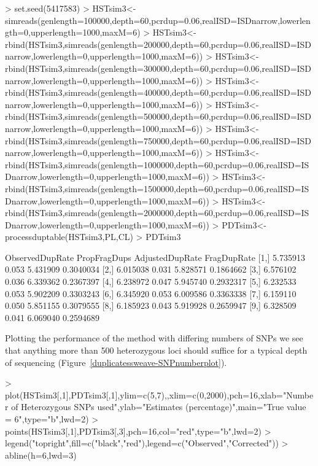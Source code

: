 \documentclass{article}
\begin{document}
\begin{Schunk}
\begin{Sinput}
> set.seed(5417583)
> HSTsim3<-simreads(genlength=100000,depth=60,pcrdup=0.06,realISD=ISDnarrow,lowerlength=0,upperlength=1000,maxM=6)
> HSTsim3<-rbind(HSTsim3,simreads(genlength=200000,depth=60,pcrdup=0.06,realISD=ISDnarrow,lowerlength=0,upperlength=1000,maxM=6))
> HSTsim3<-rbind(HSTsim3,simreads(genlength=300000,depth=60,pcrdup=0.06,realISD=ISDnarrow,lowerlength=0,upperlength=1000,maxM=6))
> HSTsim3<-rbind(HSTsim3,simreads(genlength=400000,depth=60,pcrdup=0.06,realISD=ISDnarrow,lowerlength=0,upperlength=1000,maxM=6))
> HSTsim3<-rbind(HSTsim3,simreads(genlength=500000,depth=60,pcrdup=0.06,realISD=ISDnarrow,lowerlength=0,upperlength=1000,maxM=6))
> HSTsim3<-rbind(HSTsim3,simreads(genlength=750000,depth=60,pcrdup=0.06,realISD=ISDnarrow,lowerlength=0,upperlength=1000,maxM=6))
> HSTsim3<-rbind(HSTsim3,simreads(genlength=1000000,depth=60,pcrdup=0.06,realISD=ISDnarrow,lowerlength=0,upperlength=1000,maxM=6))
> HSTsim3<-rbind(HSTsim3,simreads(genlength=1500000,depth=60,pcrdup=0.06,realISD=ISDnarrow,lowerlength=0,upperlength=1000,maxM=6))
> HSTsim3<-rbind(HSTsim3,simreads(genlength=2000000,depth=60,pcrdup=0.06,realISD=ISDnarrow,lowerlength=0,upperlength=1000,maxM=6))
> PDTsim3<-processduptable(HSTsim3,PL,CL)
> PDTsim3
\end{Sinput}
\begin{Soutput}
      ObservedDupRate PropFragDups AdjustedDupRate FragDupRate
 [1,]        5.735913        0.053        5.431909   0.3040034
 [2,]        6.015038        0.031        5.828571   0.1864662
 [3,]        6.576102        0.036        6.339362   0.2367397
 [4,]        6.238972        0.047        5.945740   0.2932317
 [5,]        6.232533        0.053        5.902209   0.3303243
 [6,]        6.345920        0.053        6.009586   0.3363338
 [7,]        6.159110        0.050        5.851155   0.3079555
 [8,]        6.185923        0.043        5.919928   0.2659947
 [9,]        6.328509        0.041        6.069040   0.2594689
\end{Soutput}
\end{Schunk}

Plotting the performance of the method with differing numbers of SNPs we see that anything more than 500 heterozygous loci should suffice for a typical depth of sequencing (Figure~\ref{duplicatessweave-SNPnumberplot}).

\begin{Schunk}
\begin{Sinput}
> plot(HSTsim3[,1],PDTsim3[,1],ylim=c(5,7),,xlim=c(0,2000),pch=16,xlab="Number of Heterozygous SNPs used",ylab="Estimates (percentage)",main="True value = 6",type="b",lwd=2)
> points(HSTsim3[,1],PDTsim3[,3],pch=16,col="red",type="b",lwd=2)
> legend("topright",fill=c("black","red"),legend=c("Observed","Corrected"))
> abline(h=6,lwd=3)
\end{Sinput}
\end{Schunk}
\end{document}
